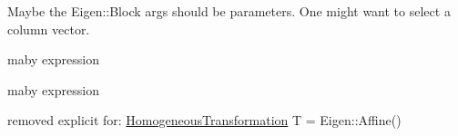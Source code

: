 
\begin{DoxyRefList}
\item[\label{todo__todo000001}%
\hypertarget{todo__todo000001}{}%
 Class \hyperlink{structEigen_1_1internal_1_1traits_3_01QuaternionRef_3_01__Derived_01_4_01_4}{Eigen\+:\+:internal\+:\+:traits$<$ Quaternion\+Ref$<$ \+\_\+\+Derived $>$ $>$} ]Maybe the Eigen\+::\+Block args should be parameters. One might want to select a column vector.  
\item[\label{todo__todo000002}%
\hypertarget{todo__todo000002}{}%
Member \hyperlink{classow__core_1_1CartesianPosition_adf7c4725b0e7c01554d431f1277b7380}{ow\+\_\+core\+:\+:Cartesian\+Position$<$ \+\_\+\+Scalar $>$\+:\+:Identity} ()]maby expression  
\item[\label{todo__todo000003}%
\hypertarget{todo__todo000003}{}%
Member \hyperlink{classow__core_1_1CartesianPosition_a58f4841421e4711b905ef7cdd4d5b8d8}{ow\+\_\+core\+:\+:Cartesian\+Position$<$ \+\_\+\+Scalar $>$\+:\+:Zero} ()]maby expression  
\item[\label{todo__todo000004}%
\hypertarget{todo__todo000004}{}%
Member \hyperlink{classow__core_1_1HomogeneousTransformation_ac1d8792424c0af25dffd0c7e38981caa}{ow\+\_\+core\+:\+:Homogeneous\+Transformation$<$ \+\_\+\+Scalar $>$\+:\+:Homogeneous\+Transformation} (const Base \&other)]removed explicit for\+: \hyperlink{classow__core_1_1HomogeneousTransformation}{Homogeneous\+Transformation} T = Eigen\+::\+Affine() 
\end{DoxyRefList}